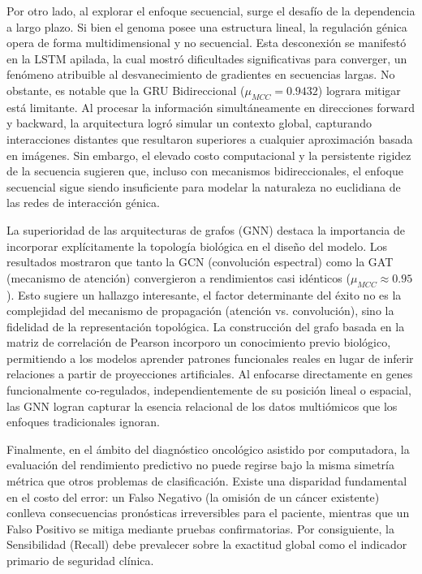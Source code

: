 \documentclass[review,12pt,times,number]{elsarticle}
\begin{document}
Por otro lado, al explorar el enfoque secuencial, surge el desafío de la dependencia a largo plazo. Si bien el genoma posee una estructura lineal, la regulación génica opera de forma multidimensional y no secuencial. Esta desconexión se manifestó en la LSTM apilada, la cual mostró dificultades significativas para converger, un fenómeno atribuible al desvanecimiento de gradientes en secuencias largas. No obstante, es notable que la GRU Bidireccional ($\mu_{MCC}=0.9432$) lograra mitigar está limitante. Al procesar la información simultáneamente en direcciones forward y backward, la arquitectura logró simular un contexto global, capturando interacciones distantes que resultaron superiores a cualquier aproximación basada en imágenes. Sin embargo, el elevado costo computacional y la persistente rigidez de la secuencia sugieren que, incluso con mecanismos bidireccionales, el enfoque secuencial sigue siendo insuficiente para modelar la naturaleza no euclidiana de las redes de interacción génica.

La superioridad de las arquitecturas de grafos (GNN) destaca la importancia de incorporar explícitamente la topología biológica en el diseño del modelo. Los resultados mostraron que tanto la GCN (convolución espectral) como la GAT (mecanismo de atención) convergieron a rendimientos casi idénticos ($\mu_{MCC} \approx 0.95$). Esto sugiere un hallazgo interesante, el factor determinante del éxito no es la complejidad del mecanismo de propagación (atención vs. convolución), sino la fidelidad de la representación topológica. La construcción del grafo basada en la matriz de correlación de Pearson incorporo un conocimiento previo biológico, permitiendo a los modelos aprender patrones funcionales reales en lugar de inferir relaciones a partir de proyecciones artificiales. Al enfocarse directamente en genes funcionalmente co-regulados, independientemente de su posición lineal o espacial, las GNN logran capturar la esencia relacional de los datos multiómicos que los enfoques tradicionales ignoran.

Finalmente, en el ámbito del diagnóstico oncológico asistido por computadora, la evaluación del rendimiento predictivo no puede regirse bajo la misma simetría métrica que otros problemas de clasificación. Existe una disparidad fundamental en el costo del error: un Falso Negativo (la omisión de un cáncer existente) conlleva consecuencias pronósticas irreversibles para el paciente, mientras que un Falso Positivo se mitiga mediante pruebas confirmatorias. Por consiguiente, la Sensibilidad (Recall) debe prevalecer sobre la exactitud global como el indicador primario de seguridad clínica.
\end{document}
